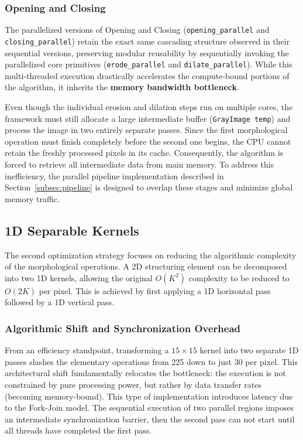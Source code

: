 \documentclass[10pt,twocolumn,letterpaper]{article}
\begin{document}
\subsubsection{Opening and Closing}
The parallelized versions of Opening and Closing (\lstinline|opening_parallel| and \lstinline|closing_parallel|) retain the exact same cascading structure observed in their sequential versions, preserving modular reusability by sequentially invoking the parallelized core primitives (\lstinline|erode_parallel| and \lstinline|dilate_parallel|).
While this multi-threaded execution drastically accelerates the compute-bound portions of the algorithm, it inherits the \textbf{memory bandwidth bottleneck}. 

Even though the individual erosion and dilation steps run on multiple cores, the framework must still allocate a large intermediate buffer (\lstinline|GrayImage temp|) and process the image in two entirely separate passes. Since the first morphological operation must finish completely before the second one begins, the CPU cannot retain the freshly processed pixels in its cache. Consequently, the algorithm is forced to retrieve all intermediate data from main memory. To address this inefficiency, the parallel pipeline implementation described in Section~\ref{subsec:pipeline} is designed to overlap these stages and minimize global memory traffic.


\subsection{1D Separable Kernels}
The second optimization strategy focuses on reducing the algorithmic complexity of the morphological operations. A 2D structuring element can be decomposed into two 1D kernels, allowing the original $O(K^2)$ complexity to be reduced to $O(2K)$ per pixel. This is achieved by first applying a 1D horizontal pass followed by a 1D vertical pass.

\subsubsection{Algorithmic Shift and Synchronization Overhead}
From an efficiency standpoint, transforming a $15 \times 15$ kernel into two separate 1D passes slashes the elementary operations from 225 down to just 30 per pixel. This architectural shift fundamentally relocates the bottleneck: the execution is not constrained by pure processing power, but rather by data transfer rates (becoming memory-bound).
This type of implementation introduces latency due to the Fork-Join model. The sequential execution of two parallel regions imposes an intermediate synchronization barrier, then the second pass can not start until all threads have completed the first pass.
\end{document}

